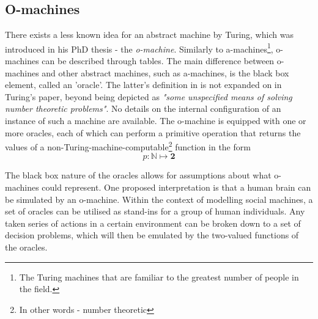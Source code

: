 \documentclass[12pt,a4,xcolor=table]{article}
\begin{document}
\subsection{O-machines}
There exists a less known idea for an abstract machine by Turing, which was introduced in his PhD thesis - the \textit{o-machine}. Similarly to a-machines\footnote{The Turing machines that are familiar to the greatest number of people in the field.}, o-machines can be described through tables. The main difference between o-machines and other abstract machines, such as a-machines, is the black box element, called an 'oracle'. The latter's definition in is not expanded on in Turing's paper, beyond being depicted as \textit{"some unspecified means of solving number theoretic problems"}\cite{Turing1938}. No details on the internal configuration of an instance of such a machine are available. The o-machine is equipped with one or more oracles, each of which can perform a primitive operation that returns the values of a non-Turing-machine-computable\footnote{In other words - number theoretic} function\cite{Copeland1998} in the form \[ p:\mathbb{N}\mapsto \mathbf{2} \]

The black box nature of the oracles allows for assumptions about what o-machines could represent. One proposed interpretation is that a human brain can be simulated by an o-machine\cite{Copeland1998}. Within the context of modelling social machines, a set of oracles can be utilised as stand-ins for a group of human individuals. Any taken series of actions in a certain environment can be broken down to a set of decision problems, which will then be emulated by the two-valued functions of the oracles.
\end{document}
